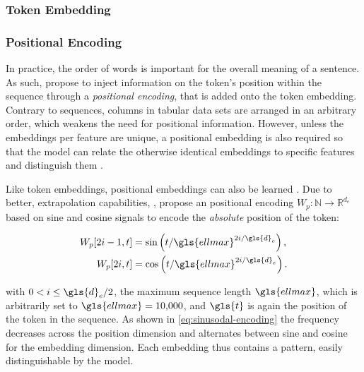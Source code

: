 \subsubsection{Token Embedding}\label{sec:token-embeddings}


\subsubsection{Positional Encoding}\label{sec:positional-encoding}

In practice, the order of words is important for the overall meaning of a sentence. As such, \textcite[][6]{vaswaniAttentionAllYou2017} propose to inject information on the token's position within the sequence through a \emph{positional encoding}, that is added onto the token embedding. Contrary to sequences, columns in tabular data sets are arranged in an arbitrary order, which weakens the need for positional information. However, unless the embeddings per feature are unique, a positional embedding is also required so that the model can relate the otherwise identical embeddings to specific features and distinguish them \autocites[][3]{huangTabTransformerTabularData2020}[][15]{somepalliSAINTImprovedNeural2021}.

Like token embeddings, positional embeddings can also be learned \autocite[cp.][4174]{devlinBERTPretrainingDeep2019}. Due to better, extrapolation capabilities, \textcite[][6]{vaswaniAttentionAllYou2017}, propose an positional encoding $W_p: \mathbb{N} \rightarrow \mathbb{R}^{d_{e}}$ based on sine and cosine signals to encode the \emph{absolute} position of the token:

\begin{equation}
  \begin{aligned}
    W_p[2 i-1, t] & =\sin \left(t / \gls{ellmax}^{2 i / \gls{d}_e}\right), \\
    W_p[2 i, t]   & =\cos \left(t / \gls{ellmax}^{2 i / \gls{d}_e}\right).
  \end{aligned}
  \label{eq:sinusodal-encoding}
\end{equation}

with $0<i \leq \gls{d}_{e} / 2$, the maximum sequence length $\gls{ellmax}$, which is arbitrarily set to $\gls{ellmax}=10{,}000$, and $\gls{t}$ is again the position of the token in the sequence. As shown in \cref{eq:sinusodal-encoding} the frequency decreases across the position dimension and alternates between sine and cosine for the embedding dimension. Each embedding thus contains a pattern, easily distinguishable by the model.

